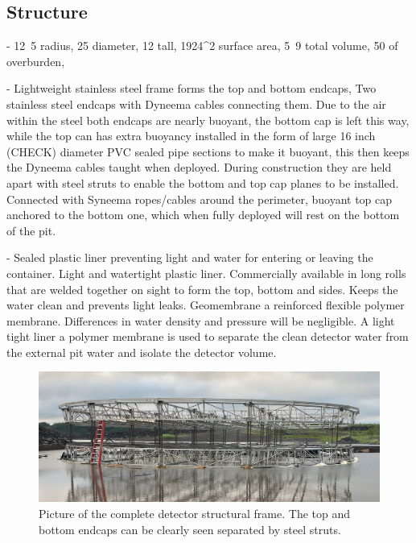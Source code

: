 \subsection{Structure} %
\label{sec:chips_detector_structure} %

- \unit{12.5}{} radius, \unit{25}{} diameter, \unit{12}{} tall,
\unit{1924}{^2} surface area, \unit{5.9}{} total volume,
\unit{50}{} of overburden,

- Lightweight stainless steel frame forms the top and bottom endcaps, Two stainless steel endcaps
with Dyneema cables connecting them. Due to the air within the steel both endcaps are nearly
buoyant, the bottom cap is left this way, while the top can has extra buoyancy installed in the
form of large 16 inch (CHECK) diameter PVC sealed pipe sections to make it buoyant, this then
keeps the Dyneema cables taught when deployed. During construction they are held apart with steel
struts to enable the bottom and top cap planes to be installed. Connected with Syneema
ropes/cables around the perimeter, buoyant top cap anchored to the bottom one, which when fully
deployed will rest on the bottom of the pit.

- Sealed plastic liner preventing light and water for entering or leaving the container. Light and
watertight plastic liner. Commercially available in long rolls that are welded together on sight
to form the top, bottom and sides. Keeps the water clean and prevents light leaks. Geomembrane a
reinforced flexible polymer membrane. Differences in water density and pressure will be
negligible. A light tight liner a polymer membrane is used to separate the clean detector water
from the external pit water and isolate the detector volume.

\begin{figure} %
    \includegraphics[width=\textwidth]{diagrams/4-chips/frame.jpeg}
    \caption[Picture of the \chipsfive detector structure.]
    {Picture of the complete \chipsfive detector structural frame. The top and bottom endcaps can
        be clearly seen separated by steel struts.}
    \label{fig:frame}
\end{figure}

